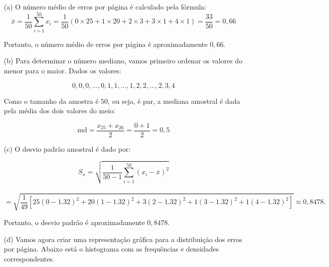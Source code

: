 \documentclass{article}
\begin{document}
\begin{enumerate}

    \item[(a)] O número médio de erros por página é calculado pela fórmula:
    \[
    \bar{x} = \frac{1}{50} \sum_{i=1}^{50} x_i = \frac{1}{50} \left( 0 \times 25 + 1 \times 20 + 2 \times 3 + 3 \times 1 + 4 \times 1 \right) = \frac{33}{50} = 0,66
    \]
    
    Portanto, o número médio de erros por página é aproximadamente $0,66$.
    
    \item[(b)] Para determinar o número mediano, vamos primeiro ordenar os valores do menor para o maior. Dados os valores:

\[ 0, 0, 0, \dots, 0, 1, 1, \dots, 1, 2, 2, \dots, 2, 3, 4 \]

Como o tamanho da amostra é $50$, ou seja, é par, a mediana amostral é dada pela média dos dois valores do meio:

\[ \text{md} = \frac{x_{25} + x_{26}}{2} = \frac{0 + 1}{2} = 0,5 \]

\item[(c)] O desvio padrão amostral é dado por:

\[
S_x = \sqrt{\frac{1}{50 - 1} \sum_{i=1}^{50} (x_i - \bar{x})^2}
\]
\\
\[
= \sqrt{\frac{1}{49} \left[ 25(0 - 1.32)^2 + 20(1 - 1.32)^2 + 3(2 - 1.32)^2 + 1(3 - 1.32)^2 + 1(4 - 1.32)^2 \right]} \approx 0,8478.
\]

Portanto, o desvio padrão é aproximadamente $0,8478$.

\item[(d)] Vamos agora criar uma representação gráfica para a distribuição dos erros por página. Abaixo está o histograma com as frequências e densidades correspondentes.



\end{enumerate}
\end{document}
